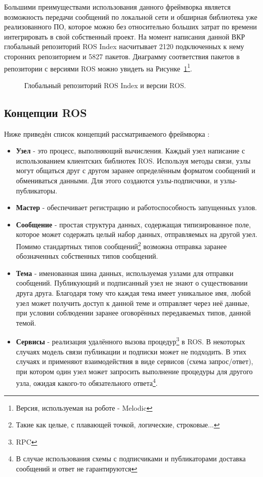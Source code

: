 Большими преимуществами использования данного фреймворка является возможность передачи сообщений по локальной сети и обширная библиотека уже реализованного ПО, которое можно без относительно больших затрат по времени интегрировать в свой собственный проект. На момент написания данной ВКР глобальный репозиторий ROS Index насчитывает 2120 подключенных к нему сторонних репозиторием и 5827 пакетов. Диаграмму соответствия пакетов в репозитории с версиями ROS можно увидеть на Рисунке~\ref{fig:ros-index}\footnote{Версия, используемая на роботе - Melodic}.

\begin{figure}[ht]
  \caption{Глобальный репозиторий ROS Index и версии ROS.}\label{fig:ros-index}
\end{figure}

\subsection{Концепции ROS}
Ниже приведён список концепций рассматриваемого фреймворка :
\begin{itemize}
\item {\textbf{Узел} - это процесс, выполняющий вычисления. Каждый узел написание с использованием клиентских библиотек ROS. Используя методы связи, узлы могут общаться друг с другом заранее определённым форматом сообщений и обмениваться данными. Для этого создаются узлы-подписчики, и узлы-публикаторы.}
\item {\textbf{Мастер} - обеспечивает регистрацию и работоспособность запущенных узлов.}
\item {\textbf{Сообщение} - простая структура данных, содержащая типизированное поле, которое может содержать целый набор данных, отправляемых на другой узел. Помимо стандартных типов сообщений\footnote{Такие как целые, с плавающей точкой, логические, строковые...} возможна отправка заранее обозначенных собственных типов сообщений.}
\item {\textbf{Тема} - именованная шина данных, используемая узлами для отправки сообщений. Публикующий и подписанный узел не знают о существовании друга друга. Благодаря тому что каждая тема имеет уникальное имя, любой узел может получить доступ к данной теме и отправляет через неё данные, при условии соблюдении заранее оговорённых передаваемых типов, данной темой.}
\item {\textbf{Сервисы} - реализация удалённого вызова процедур\footnote{RPC} в ROS. В некоторых случаях модель связи публикации и подписки может не подходить. В этих случаях и применяют взаимодействия в виде сервисов (схема запрос/ответ), при котором один узел может запросить выполнение процедуры для другого узла, ожидая какого-то обязательного ответа\footnote{В случае использования схемы с подписчиками и публикаторами доставка сообщений и ответ не гарантируются}.}
\end{itemize}

